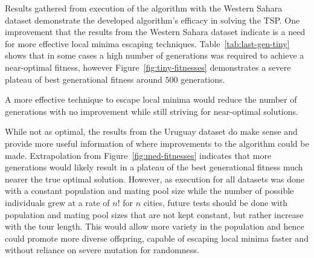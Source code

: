 Results gathered from execution of the algorithm with the Western Sahara
dataset demonstrate the developed algorithm's efficacy in solving
the TSP. One improvement that the results from the Western Sahara
dataset indicate is a need for more effective local minima escaping 
techniques. Table~\ref{tab:last-gen-tiny} shows that in some cases
a high number of generations was required to achieve a near-optimal 
fitness, however Figure~\ref{fig:tiny-fitnesses} demonstrates a severe
plateau of best generational fitness around $500$ generations.

A more effective technique to escape local minima would reduce the 
number of generations with no improvement while still striving for 
near-optimal solutions.

While not as optimal, the results from the Uruguay dataset
do make sense and provide more useful information of where improvements
to the algorithm could be made. Extrapolation from 
Figure~\ref{fig:med-fitnesses} indicates that more generations would likely 
result in a plateau of the best generational fitness much nearer the true
optimal solution. However, as execution for all datasets was done with
a constant population and mating pool size while the number of 
possible individuals grew at a rate of $n!$ for $n$ cities, future 
tests should be done with population and mating pool sizes that are not 
kept constant, but rather increase with the tour length. This would allow 
more variety in the population and hence could promote more diverse 
offspring, capable of escaping local minima faster and without 
reliance on severe mutation for randomness.